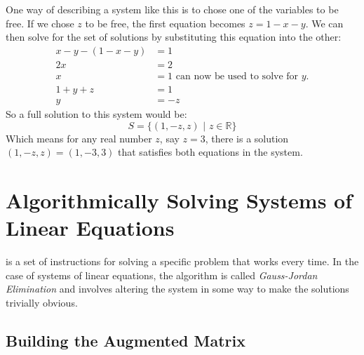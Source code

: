 \documentclass{tufte-book}
\begin{document}
One way of describing a system like this is to chose one of the variables to be free. If we chose $z$ to be free, the
first equation becomes $z=1-x-y$. We can then solve for the set of solutions by substituting this equation into the
other:
\begin{align*}
	x-y-(1-x-y) & = 1                                           \\
	2x          & = 2                                           \\
	x           & = 1 \text{ can now be used to solve for $y$.} \\
	1 + y + z   & = 1                                           \\
	y           & = -z
\end{align*}
So a full solution to this system would be:
\begin{equation*}
	S=\{(1,-z,z)\text{ | }z \in \mathbb{R}\}
\end{equation*}
Which means for any real number $z$, say $z=3$, there is a solution $(1,-z,z)=(1,-3,3)$ that satisfies both equations
in the system.

\section{Algorithmically Solving Systems of Linear Equations}

 is a set of instructions for solving a specific problem that works every time. In the case
of systems of linear equations, the algorithm is called \emph{Gauss-Jordan Elimination} and involves altering the
system in some way to make the solutions trivially obvious.

\subsection{Building the Augmented Matrix}
\end{document}
